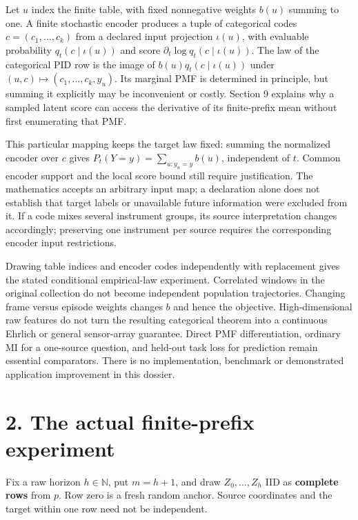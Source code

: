 \documentclass[11pt,a4paper]{article}
\begin{document}
Let \(u\) index the finite table, with fixed nonnegative weights \(b(u)\) summing to one. A finite stochastic encoder produces a tuple of categorical codes \(c=(c_1,\ldots,c_k)\) from a declared input projection \(\iota(u)\), with evaluable probability \(q_t(c\mid\iota(u))\) and score \(\partial_t\log q_t(c\mid\iota(u))\). The law of the categorical PID row is the image of \(b(u)q_t(c\mid\iota(u))\) under \((u,c)\mapsto(c_1,\ldots,c_k,y_u)\). Its marginal PMF is determined in principle, but summing it explicitly may be inconvenient or costly. Section 9 explains why a sampled latent score can access the derivative of its finite-prefix mean without first enumerating that PMF.

This particular mapping keeps the target law fixed: summing the normalized encoder over \(c\) gives \(P_t(Y=y)=\sum_{u:y_u=y}b(u)\), independent of \(t\). Common encoder support and the local score bound still require justification. The mathematics accepts an arbitrary input map; a declaration alone does not establish that target labels or unavailable future information were excluded from it. If a code mixes several instrument groups, its source interpretation changes accordingly; preserving one instrument per source requires the corresponding encoder input restrictions.

Drawing table indices and encoder codes independently with replacement gives the stated conditional empirical-law experiment. Correlated windows in the original collection do not become independent population trajectories. Changing frame versus episode weights changes \(b\) and hence the objective. High-dimensional raw features do not turn the resulting categorical theorem into a continuous Ehrlich or general sensor-array guarantee. Direct PMF differentiation, ordinary MI for a one-source question, and held-out task loss for prediction remain essential comparators. There is no implementation, benchmark or demonstrated application improvement in this dossier.

\section{2. The actual finite-prefix experiment}\label{the-actual-finite-prefix-experiment}

Fix a raw horizon \(h\in\mathbb N\), put \(m=h+1\), and draw \(Z_0,\ldots,Z_h\) IID as \textbf{complete rows} from \(p\). Row zero is a fresh random anchor. Source coordinates and the target within one row need not be independent.
\end{document}
